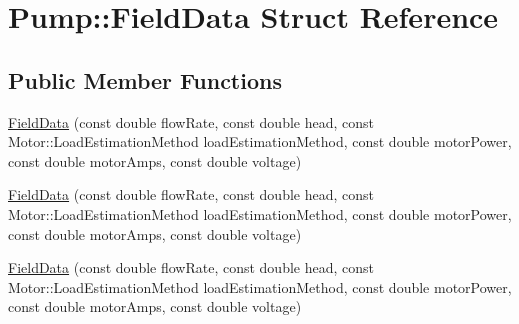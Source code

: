 \hypertarget{struct_pump_1_1_field_data}{}\section{Pump\+:\+:Field\+Data Struct Reference}
\label{struct_pump_1_1_field_data}
\subsection*{Public Member Functions}
\begin{DoxyCompactItemize}
\item 
\hyperlink{struct_pump_1_1_field_data_ad35a6b6b9a02174c0e32ed6adebb8b75}{Field\+Data} (const double flow\+Rate, const double head, const Motor\+::\+Load\+Estimation\+Method load\+Estimation\+Method, const double motor\+Power, const double motor\+Amps, const double voltage)
\item 
\hyperlink{struct_pump_1_1_field_data_ad35a6b6b9a02174c0e32ed6adebb8b75}{Field\+Data} (const double flow\+Rate, const double head, const Motor\+::\+Load\+Estimation\+Method load\+Estimation\+Method, const double motor\+Power, const double motor\+Amps, const double voltage)
\item 
\hyperlink{struct_pump_1_1_field_data_ad35a6b6b9a02174c0e32ed6adebb8b75}{Field\+Data} (const double flow\+Rate, const double head, const Motor\+::\+Load\+Estimation\+Method load\+Estimation\+Method, const double motor\+Power, const double motor\+Amps, const double voltage)
\end{DoxyCompactItemize}
